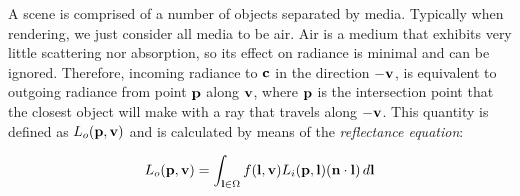 A scene is comprised of a number of objects separated by media. Typically when rendering, we just consider all media to be air. Air is a medium that exhibits very little scattering nor absorption, so its effect on radiance is minimal and can be ignored. Therefore, incoming radiance to \begin{math}\mathbf{c}\end{math} in the direction \begin{math}\mathbf{-v}\end{math}, is equivalent to outgoing radiance from point \begin{math}\mathbf{p}\end{math} along \begin{math}\mathbf{v}\end{math}, where \begin{math}\mathbf{p}\end{math} is the intersection point that the closest object will make with a ray that travels along \begin{math}\mathbf{-v}\end{math}. This quantity is defined as \begin{math}L_o(\mathbf{p}, \mathbf{v})\end{math} and is calculated by means of the \textit{reflectance equation}:

\begin{equation}
	L_o(\mathbf{p}, \mathbf{v}) = \int_{\mathbf{l}\in\Omega}f(\mathbf{l}, \mathbf{v})L_i(\mathbf{p}, \mathbf{l})(\mathbf{n}\cdot\mathbf{l})\,d\mathbf{l}
\end{equation}


